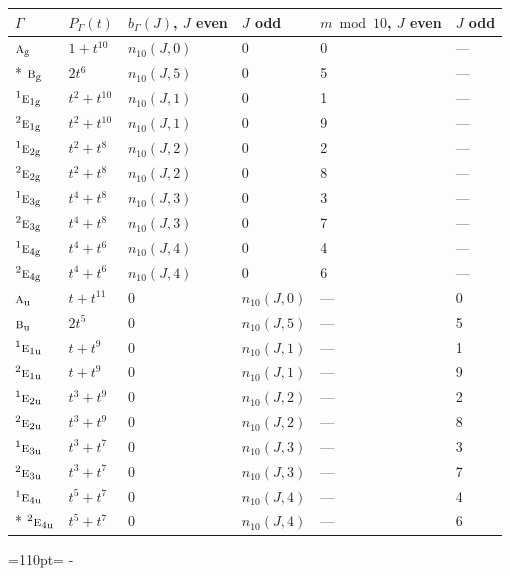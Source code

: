 \documentclass[10pt,a4paper]{article}
\newcommand{\needspace}[1]{\par\penalty-100\begingroup\dimen0=#1\relax\dimen2=\pagegoal
  \advance\dimen2-\pagetotal\ifdim\dimen0>\dimen2\relax\ifdim\dimen2>0pt\vfil\break\fi\fi
  \endgroup}
\numberwithin{equation}{section}
\newcommand{\irr}[1]{\text{\normalfont\scshape #1}}
\newcommand{\conjpair}[1]{{}^{#1}}
\newcommand{\ptag}[1]{\mathrm{#1}}
\begin{document}
{\small\begin{longtable}{@{}llllll@{}}\toprule
$\Gamma$ & $P_\Gamma(t)$ & $b_\Gamma(J)$, $J$ even & $J$ odd & $m \bmod 10$, $J$ even & $J$ odd\\\midrule\endhead
\bottomrule\endfoot\endlastfoot
$\irr{a}_{\ptag{g}}$ & $1 + t^{10}$ & $n_{10}(J,0)$ & $0$ & 0 & ---\\*
$\irr{b}_{\ptag{g}}$ & $2t^{6}$ & $n_{10}(J,5)$ & $0$ & 5 & ---\\
$\conjpair{1}\irr{e}_{1\ptag{g}}$ & $t^{2} + t^{10}$ & $n_{10}(J,1)$ & $0$ & 1 & ---\\
$\conjpair{2}\irr{e}_{1\ptag{g}}$ & $t^{2} + t^{10}$ & $n_{10}(J,1)$ & $0$ & 9 & ---\\
$\conjpair{1}\irr{e}_{2\ptag{g}}$ & $t^{2} + t^{8}$ & $n_{10}(J,2)$ & $0$ & 2 & ---\\
$\conjpair{2}\irr{e}_{2\ptag{g}}$ & $t^{2} + t^{8}$ & $n_{10}(J,2)$ & $0$ & 8 & ---\\
$\conjpair{1}\irr{e}_{3\ptag{g}}$ & $t^{4} + t^{8}$ & $n_{10}(J,3)$ & $0$ & 3 & ---\\
$\conjpair{2}\irr{e}_{3\ptag{g}}$ & $t^{4} + t^{8}$ & $n_{10}(J,3)$ & $0$ & 7 & ---\\
$\conjpair{1}\irr{e}_{4\ptag{g}}$ & $t^{4} + t^{6}$ & $n_{10}(J,4)$ & $0$ & 4 & ---\\
$\conjpair{2}\irr{e}_{4\ptag{g}}$ & $t^{4} + t^{6}$ & $n_{10}(J,4)$ & $0$ & 6 & ---\\
$\irr{a}_{\ptag{u}}$ & $t + t^{11}$ & $0$ & $n_{10}(J,0)$ & --- & 0\\
$\irr{b}_{\ptag{u}}$ & $2t^{5}$ & $0$ & $n_{10}(J,5)$ & --- & 5\\
$\conjpair{1}\irr{e}_{1\ptag{u}}$ & $t + t^{9}$ & $0$ & $n_{10}(J,1)$ & --- & 1\\
$\conjpair{2}\irr{e}_{1\ptag{u}}$ & $t + t^{9}$ & $0$ & $n_{10}(J,1)$ & --- & 9\\
$\conjpair{1}\irr{e}_{2\ptag{u}}$ & $t^{3} + t^{9}$ & $0$ & $n_{10}(J,2)$ & --- & 2\\
$\conjpair{2}\irr{e}_{2\ptag{u}}$ & $t^{3} + t^{9}$ & $0$ & $n_{10}(J,2)$ & --- & 8\\
$\conjpair{1}\irr{e}_{3\ptag{u}}$ & $t^{3} + t^{7}$ & $0$ & $n_{10}(J,3)$ & --- & 3\\
$\conjpair{2}\irr{e}_{3\ptag{u}}$ & $t^{3} + t^{7}$ & $0$ & $n_{10}(J,3)$ & --- & 7\\
$\conjpair{1}\irr{e}_{4\ptag{u}}$ & $t^{5} + t^{7}$ & $0$ & $n_{10}(J,4)$ & --- & 4\\*
$\conjpair{2}\irr{e}_{4\ptag{u}}$ & $t^{5} + t^{7}$ & $0$ & $n_{10}(J,4)$ & --- & 6\\
\bottomrule\end{longtable}}
\needspace{110pt}
\end{document}
